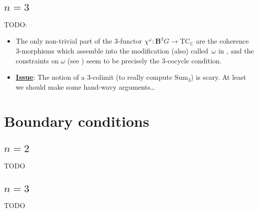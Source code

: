 \documentclass[12pt]{scrartcl}
\newcommand{\boldB}{\boldsymbol{B}}
\newcommand{\C}{\mathds{C}}
\theoremstyle{definition}
\numberwithin{equation}{section}
\numberwithin{definition}{section}
\numberwithin{figure}{section}
\begin{document}
\subsection{$n=3$}

TODO:
\begin{itemize}
\item
The only non-trivial part of the 3-functor $\chi^\omega \colon \boldB^3 G \to \text{TC}_\C$ are the coherence 3-morphisms which assemble into the modification (also) called~$\omega$ in \cite[Def.\,A.4.3]{GregorDiss}, and the constraints on $\omega$ (see \cite[Page~219]{GregorDiss}) seem to be precisely the 3-cocycle condition. 
\item
\underline{\textbf{Issue}}: The notion of a 3-colimit (to really compute $\text{Sum}_3$) is scary. 
At least we should make some hand-wavy arguments\dots
\end{itemize}


\section{Boundary conditions}

\subsection{$n=2$}

TODO

\subsection{$n=3$}

TODO
\end{document}
